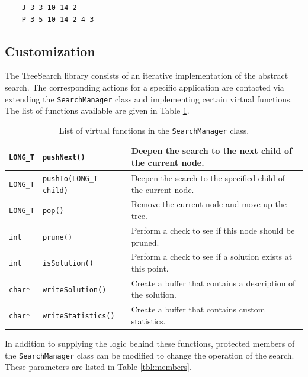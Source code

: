 \documentclass[11pt]{article}
\def\TreeSearch{{TreeSearch}}
\begin{document}
\begin{verbatim}
    J 3 3 10 14 2
    P 3 5 10 14 2 4 3
\end{verbatim}

\subsection{Customization}

The {\TreeSearch} library consists of an iterative implementation of the abstract search.
The corresponding actions for a specific application are contacted via extending 
	the \texttt{SearchManager} class and implementing certain virtual functions.
The list of functions available are given in Table \ref{tbl:functions}.

	
\begin{table}[htb]\centering
\begin{tabular}[H]{|ll|p{3in}|}
	\hline
	\texttt{LONG\_T} & \texttt{pushNext()} & 
		Deepen the search to the next child of the current node.\\
	\hline
	\texttt{LONG\_T} & \texttt{pushTo(LONG\_T child)} & 
		Deepen the search to the specified child of the current node.\\
	\hline
	\texttt{LONG\_T} & \texttt{pop()} & 
		Remove the current node and move up the tree.\\
	\hline
	\texttt{int} & \texttt{prune()}  & 
		Perform a check to see if this node should be pruned.\\
	\hline
	\texttt{int} & \texttt{isSolution()} & 
		Perform a check to see if a solution exists at this point.\\
	\hline
	\texttt{char*} & \texttt{writeSolution()} & 
		Create a buffer that contains a description of the solution.\\
	\hline
	\texttt{char*} & \texttt{writeStatistics()}  & 
		Create a buffer that contains custom statistics.\\
	\hline
\end{tabular}
\caption{\label{tbl:functions}List of virtual functions in the \texttt{SearchManager} class.}
\end{table}


In addition to supplying the logic behind these functions, 
	protected members of the \texttt{SearchManager} class can be modified to change the
	operation of the search.
These parameters are listed in Table \ref{tbl:members}.
\end{document}
